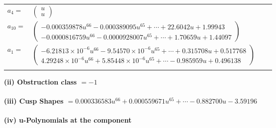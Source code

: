 \documentclass[1p]{elsarticle_modified}
\theoremstyle{definition}
\begin{document}
\begin{tabular}{m{7pt} m{180pt} m{7pt} m{180pt} }
\flushright $a_{4}=$&$\begin{pmatrix}u\\u\end{pmatrix}$ \\
\flushright $a_{10}=$&$\begin{pmatrix}-0.000359878 u^{66}-0.000389095 u^{65}+\cdots+22.6042 u+1.99943\\-0.0000816759 u^{66}-0.0000928007 u^{65}+\cdots+1.70659 u+1.44097\end{pmatrix}$ \\
\flushright $a_{1}=$&$\begin{pmatrix}-6.21813\times10^{-6} u^{66}-9.54570\times10^{-6} u^{65}+\cdots+0.315708 u+0.517768\\4.29248\times10^{-6} u^{66}+5.85448\times10^{-6} u^{65}+\cdots-0.985959 u+0.496138\end{pmatrix}$\\&\end{tabular}
\flushleft \textbf{(ii) Obstruction class $= -1$}\\~\\
\flushleft \textbf{(iii) Cusp Shapes $= 0.000336583 u^{66}+0.000559671 u^{65}+\cdots-0.882700 u-3.59196$}\\~\\
\newpage\renewcommand{\arraystretch}{1}
\flushleft \textbf{(iv) u-Polynomials at the component}\newline \\
\end{document}
